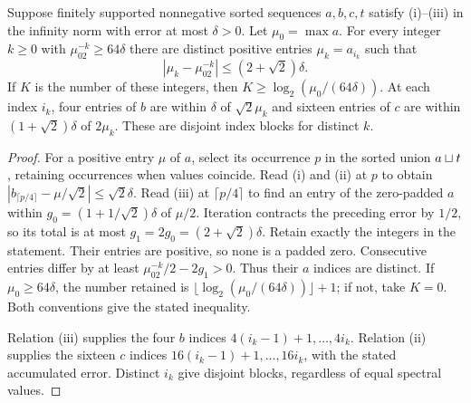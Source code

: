 \begin{lemma}\label{lem:descent}
Suppose finitely supported nonnegative sorted sequences $a,b,c,t$
satisfy (i)--(iii) in the infinity norm with error at most $\delta>0$.
Let $\mu_0=\max a$. For every integer $k\geq0$ with
$\mu_02^{-k}\geq64\delta$ there are distinct positive entries
$\mu_k=a_{i_k}$ such that
\begin{equation}\label{eq:descenterror}
|\mu_k-\mu_02^{-k}|\leq(2+\sqrt2)\delta.
\end{equation}
If $K$ is the number of these integers, then
$K\geq\log_2(\mu_0/(64\delta))$.
At each index $i_k$, four entries of $b$ are within $\delta$ of
$\sqrt2\mu_k$ and sixteen entries of $c$ are within
$(1+\sqrt2)\delta$ of $2\mu_k$. These are disjoint index blocks
for distinct $k$.
\end{lemma}
\begin{proof}
For a positive entry $\mu$ of $a$, select its occurrence $p$ in the
sorted union $a\sqcup t$, retaining occurrences when values coincide.
Read (i) and (ii) at $p$ to obtain
$|b_{\lceil p/4\rceil}-\mu/\sqrt2|\leq\sqrt2\delta$.
Read (iii) at $\lceil p/4\rceil$ to find an entry of the zero-padded
$a$ within
$g_0=(1+1/\sqrt2)\delta$ of $\mu/2$.
Iteration contracts the preceding error by $1/2$, so its total is at
most $g_1=2g_0=(2+\sqrt2)\delta$.
Retain exactly the integers in the statement. Their entries are
positive, so none is a padded zero. Consecutive entries differ by at
least $\mu_02^{-k}/2-2g_1>0$. Thus their $a$ indices are distinct.
If $\mu_0\geq64\delta$, the number retained is
$\lfloor\log_2(\mu_0/(64\delta))\rfloor+1$; if not, take $K=0$.
Both conventions give the stated inequality.

Relation (iii) supplies the four $b$ indices
$4(i_k-1)+1,\ldots,4i_k$. Relation (ii) supplies the sixteen $c$
indices $16(i_k-1)+1,\ldots,16i_k$, with the stated accumulated error.
Distinct $i_k$ give disjoint blocks, regardless of equal spectral values.
\end{proof}

